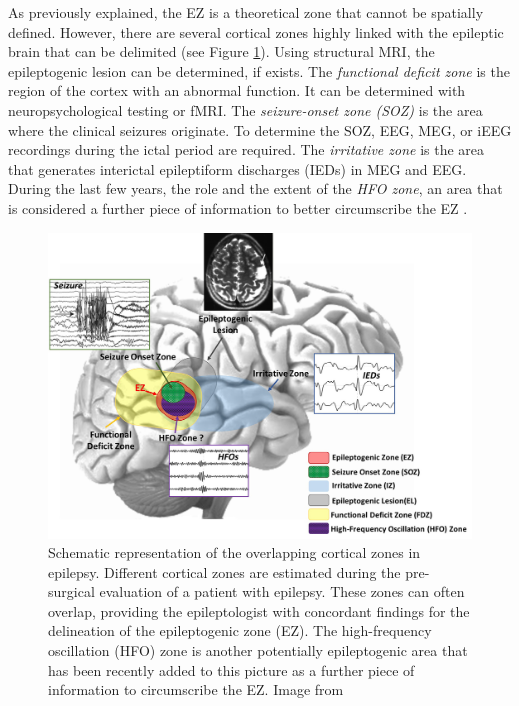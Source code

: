 As previously explained, the EZ is a theoretical zone that cannot be spatially defined. However, there are several cortical zones highly linked with the epileptic brain that can be delimited (see Figure \ref{fig:epiZones}). Using structural MRI, the epileptogenic lesion can be determined, if exists. The \emph{functional deficit zone} is the region of the cortex with an abnormal function. It can be determined with neuropsychological testing or fMRI. The \emph{seizure-onset zone (SOZ)}  is the area where the clinical seizures originate. To determine the SOZ, EEG, MEG, or iEEG recordings during the ictal period are required. The \emph{irritative zone} is the area that generates interictal epileptiform discharges (IEDs) in MEG and EEG. During the last few years, the role and the extent of the \emph{HFO zone}, an area that is considered a further piece of information to better circumscribe the EZ \citep{Tamilia2017}.

\begin{figure}[ht]
\centering
\includegraphics[width=1\textwidth]{Images/epiZones.png}
\caption{Schematic representation of the overlapping cortical zones in epilepsy. Different cortical zones are estimated during the pre-surgical evaluation of a patient with epilepsy. These zones can often overlap, providing the epileptologist with concordant findings for the delineation of the epileptogenic zone (EZ). The high-frequency oscillation (HFO) zone is another potentially epileptogenic area that has been recently added to this picture as a further piece of information to circumscribe the EZ. Image from \citep{Tamilia2017}}
\label{fig:epiZones}
\end{figure}      

